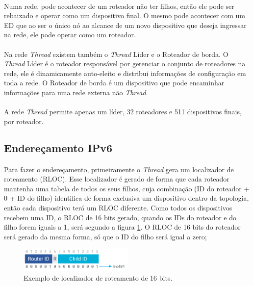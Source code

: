 \paragraph{} Numa rede, pode acontecer de um roteador não ter filhos, então ele pode ser rebaixado e operar como um dispositivo final. O mesmo pode acontecer com um ED que ao ser o único nó ao alcance de um novo dispositivo que deseja ingressar na rede, ele pode operar como um roteador.

\paragraph{} Na rede \textit{Thread} existem também o \textit{Thread} Líder e o Roteador de borda. O \textit{Thread} Líder é o roteador responsável por gerenciar o conjunto de roteadores na rede, ele é dinamicamente auto-eleito e distribui informações de configuração em toda a rede. O Roteador de borda é um dispositivo que pode encaminhar informações para uma rede externa não \textit{Thread}.

\paragraph{} A rede \textit{Thread} permite apenas um líder, 32 roteadores e 511 dispositivos finais, por roteador.

\subsection{Endereçamento IPv6}
\paragraph{} Para fazer o endereçamento, primeiramente o \textit{Thread} gera um localizador de roteamento (RLOC). Esse localizador é gerado de forma que cada roteador mantenha uma tabela de todos os seus filhos, cuja combinação (ID do roteador + 0 + ID do filho) identifica de forma exclusiva um dispositivo dentro da topologia, então cada dispositivo terá um RLOC diferente. Como todos os dispositivos recebem uma ID, o RLOC de 16 bits gerado, quando os IDs do roteador e do filho forem iguais a 1, será segundo a figura \ref{fig:figura14}. O RLOC de 16 bits do roteador será gerado da mesma forma, só que o ID do filho será igual a zero;

\begin{figure}[!ht]
	\centering
	\includegraphics[width=0.5\textwidth]{Figuras/RLOC16.PNG}   
	\caption{Exemplo de localizador de roteamento de 16 bits. \citep{Open}}
	\label{fig:figura14}
\end{figure}

